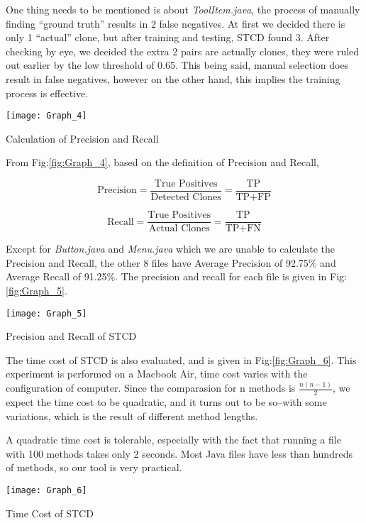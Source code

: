 \documentclass[../main.tex]{subfiles}
\begin{document}
One thing needs to be mentioned is about \textit{ToolItem.java}, the process of manually finding ``ground truth'' results in 2 false negatives. At first we decided there is only 1 ``actual'' clone, but after training and testing, STCD found 3. After checking by eye, we decided the extra 2 pairs are actually clones, they were ruled out earlier by the low threshold of 0.65. This being said, manual selection does result in false negatives, however on the other hand, this implies the training process is effective.

\begin{figurehere}
\centering \texttt{[image: Graph\_4]} 
\caption{Calculation of Precision and Recall} \label{fig:Graph_4}
\end{figurehere}

From Fig:\ref{fig:Graph_4}, based on the definition of Precision and Recall, 

\begin{equation}
\text{Precision} = \frac{ \text{True Positives}} {\text{Detected Clones}} = \frac{ \text{TP}} {\text{TP} + \text{FP}}
\end{equation}

\begin{equation}
\text{Recall} = \frac{ \text{True Positives}} {\text{Actual Clones}} = \frac{ \text{TP}} {\text{TP} + \text{FN}}
\end{equation}

Except for \textit{Button.java} and \textit{Menu.java} which we are unable to calculate the Precision and Recall, the other 8 files have Average Precision of 92.75\% and Average Recall of 91.25\%. The precision and recall for each file is given in Fig:\ref{fig:Graph_5}.

\begin{figurehere}
\centering \texttt{[image: Graph\_5]} 
\caption{Precision and Recall of STCD} \label{fig:Graph_5}
\end{figurehere}

The time cost of STCD is also evaluated, and is given in Fig:\ref{fig:Graph_6}. This experiment is performed on a Macbook Air, time cost varies with the configuration of computer. Since the comparasion for n methods is $\frac{n(n-1)}{2}$, we expect the time cost to be quadratic, and it turns out to be so--with some variations, which is the result of different method lengths.

A quadratic time cost is tolerable, especially with the fact that running a file with 100 methods takes only 2 seconds. Most Java files have less than hundreds of methods, so our tool is very practical.

\begin{figurehere}
\centering \texttt{[image: Graph\_6]} 
\caption{Time Cost of STCD} \label{fig:Graph_6}
\end{figurehere}
\end{document}
